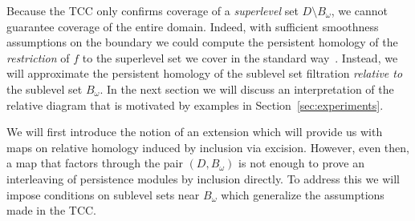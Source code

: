 
Because the TCC only confirms coverage of a \emph{superlevel} set $D\setminus B_\omega$, we cannot guarantee coverage of the entire domain.
Indeed, with sufficient smoothness assumptions on the boundary we could compute the persistent homology of the \emph{restriction} of $f$ to the superlevel set we cover in the standard way~\cite{chazal09analysis}.
Instead, we will approximate the persistent homology of the sublevel set filtration \emph{relative to} the sublevel set $B_\omega$.
In the next section we will discuss an interpretation of the relative diagram that is motivated by examples in Section~\ref{sec:experiments}.

We will first introduce the notion of an extension which will provide us with maps on relative homology induced by inclusion via excision.
However, even then, a map that factors through the pair $(D, B_\omega)$ is not enough to prove an interleaving of persistence modules by inclusion directly.
To address this we will impose conditions on sublevel sets near $B_\omega$ which generalize the assumptions made in the TCC.

